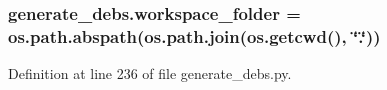 \subsubsection[{\texorpdfstring{workspace\+\_\+folder}{workspace_folder}}]{\setlength{\rightskip}{0pt plus 5cm}generate\+\_\+debs.\+workspace\+\_\+folder = os.\+path.\+abspath(os.\+path.\+join(os.\+getcwd(), \char`\"{}.\char`\"{}))}\hypertarget{namespacegenerate__debs_acb69863b90257249a30e43ebacfb8bd8}{}\label{namespacegenerate__debs_acb69863b90257249a30e43ebacfb8bd8}


Definition at line 236 of file generate\+\_\+debs.\+py.

